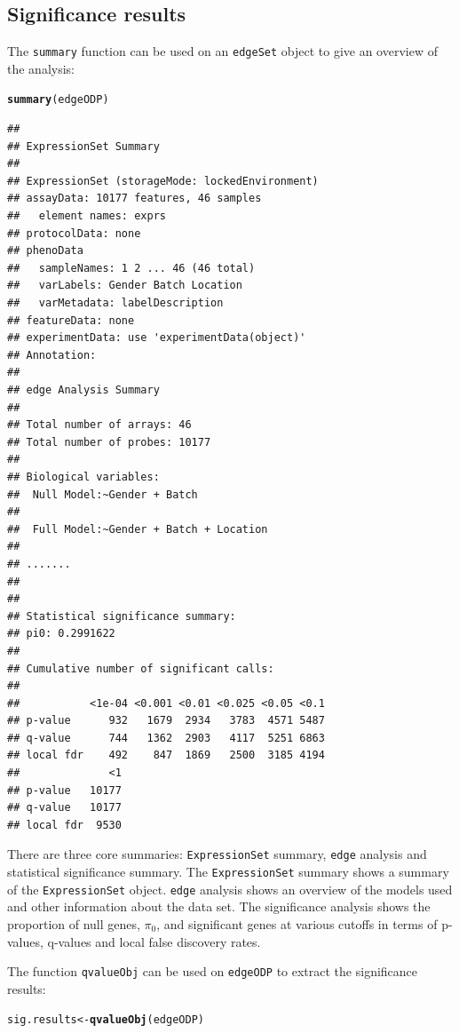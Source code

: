 \documentclass{article}\usepackage[]{graphicx}\usepackage[]{color}
\makeatletter
\newcommand{\hlstd}[1]{\textcolor[rgb]{0.345,0.345,0.345}{#1}}%
\newcommand{\hlkwb}[1]{\textcolor[rgb]{0.69,0.353,0.396}{#1}}%
\newcommand{\hlkwd}[1]{\textcolor[rgb]{0.737,0.353,0.396}{\textbf{#1}}}%
\newenvironment{kframe}{%
 \def\at@end@of@kframe{}%
 \ifinner\ifhmode%
  \def\at@end@of@kframe{\end{minipage}}%
  \begin{minipage}{\columnwidth}%
 \fi\fi%
 \def\FrameCommand##1{\hskip\@totalleftmargin \hskip-\fboxsep
 \colorbox{shadecolor}{##1}\hskip-\fboxsep
     \hskip-\linewidth \hskip-\@totalleftmargin \hskip\columnwidth}%
 \MakeFramed {\advance\hsize-\width
   \@totalleftmargin\z@ \linewidth\hsize
   \@setminipage}}%
 {\par\unskip\endMakeFramed%
 \at@end@of@kframe}
\newenvironment{knitrout}{}{} %
\makeatother
\begin{document}
\subsection{Significance results}
The {\tt summary} function can be used on an {\tt edgeSet} object to give an overview of the analysis:
\begin{knitrout}
\color{fgcolor}\begin{kframe}
\begin{alltt}
\hlkwd{summary}\hlstd{(edgeODP)}
\end{alltt}
\begin{verbatim}
## 
## ExpressionSet Summary 
##  
## ExpressionSet (storageMode: lockedEnvironment)
## assayData: 10177 features, 46 samples 
##   element names: exprs 
## protocolData: none
## phenoData
##   sampleNames: 1 2 ... 46 (46 total)
##   varLabels: Gender Batch Location
##   varMetadata: labelDescription
## featureData: none
## experimentData: use 'experimentData(object)'
## Annotation:  
## 
## edge Analysis Summary 
##  
## Total number of arrays: 46 
## Total number of probes: 10177 
##  
## Biological variables: 
## 	Null Model:~Gender + Batch
## 
## 	Full Model:~Gender + Batch + Location
## 
## ....... 
##  
## 
## Statistical significance summary:
## pi0:	0.2991622	
## 
## Cumulative number of significant calls:
## 
##           <1e-04 <0.001 <0.01 <0.025 <0.05 <0.1
## p-value      932   1679  2934   3783  4571 5487
## q-value      744   1362  2903   4117  5251 6863
## local fdr    492    847  1869   2500  3185 4194
##              <1
## p-value   10177
## q-value   10177
## local fdr  9530
\end{verbatim}
\end{kframe}
\end{knitrout}
There are three core summaries: {\tt ExpressionSet} summary, {\tt edge} analysis and statistical significance summary. The {\tt ExpressionSet} summary shows a summary of the {\tt ExpressionSet} object. {\tt edge} analysis shows an overview of the models used and other information about the data set. The significance analysis shows the proportion of null genes, $\pi_{0}$, and significant genes at various cutoffs in terms of p-values, q-values and local false discovery rates.

The function {\tt qvalueObj} can be used on {\tt edgeODP} to extract the significance results:
\begin{knitrout}
\color{fgcolor}\begin{kframe}
\begin{alltt}
\hlstd{sig.results} \hlkwb{<-} \hlkwd{qvalueObj}\hlstd{(edgeODP)}
\end{alltt}
\end{kframe}
\end{knitrout}
\end{document}

